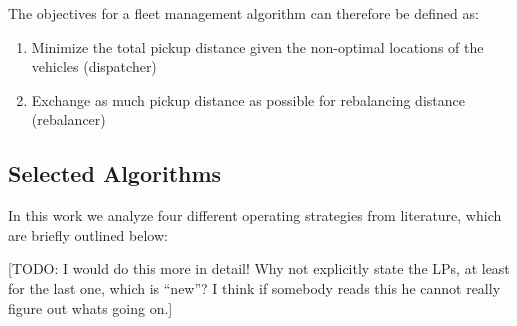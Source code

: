 The objectives for a fleet management algorithm can therefore be defined as:

\begin{enumerate}
\item Minimize the total pickup distance given the non-optimal locations of the vehicles (dispatcher)
\item Exchange as much pickup distance as possible for rebalancing distance (rebalancer)
\end{enumerate}

\subsection{Selected Algorithms}

In this work we analyze four different operating strategies from literature,
which are briefly outlined below:

[TODO: I would do this more in detail! Why not explicitly state the LPs, at least
for the last one, which is ``new''? I think if somebody reads this he cannot really figure out whats going on.]

